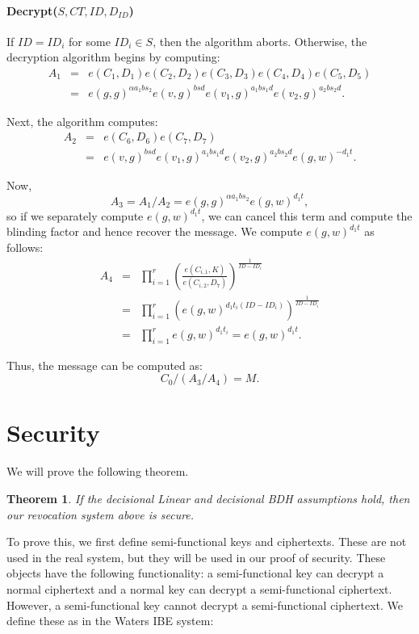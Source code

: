 \documentclass[a4paper, 11pt]{article}
\newtheorem{theorem}{Theorem}
\newtheorem{theorem}{Theorem}[section]
\theoremstyle{definition}
\begin{document}
\paragraph{Decrypt($S, CT, ID, D_{ID}$)} If $ID = ID_i$ for some $ID_i \in S$, then the algorithm aborts. Otherwise, the decryption algorithm begins by computing:
\begin{eqnarray}
 \nonumber
  A_1 &=& e(C_1, D_1) e(C_2,D_2) e(C_3,D_3) e(C_4, D_4) e(C_5, D_5) \\
  \nonumber
   &=& e(g,g)^{\alpha a_1 b s_2} e(v,g)^{bsd}e(v_1,g)^{a_1bs_1d}e(v_2,g)^{a_2bs_2 d}.
\end{eqnarray}

Next, the algorithm computes:
\begin{eqnarray}
\nonumber
A_2 & = & e(C_6,D_6) e(C_7, D_7) \\ \nonumber
 & = & e(v,g)^{bsd}e(v_1,g)^{a_1bs_1 d}e(v_2,g)^{a_2 b s_2 d} e(g,w)^{-d_1 t}.
\end{eqnarray}

Now,
\[A_3 = A_1/A_2 = e(g,g)^{\alpha a_1 b s_2} e(g,w)^{d_1 t},\]  so if we separately compute $e(g,w)^{d_1 t}$, we can cancel this term and compute the blinding factor and hence recover the message. We compute $e(g,w)^{d_1 t}$ as follows:
\begin{eqnarray}
\nonumber
A_4 & = & \prod_{i=1}^r \left(\frac{e(C_{i,1},K)}{e(C_{i,2},D_7)}\right)^{\frac{1}{ID-ID_i}} \\
\nonumber
 & = & \prod_{i=1}^r \left( e(g,w)^{d_1 t_i (ID-ID_i)}\right)^{\frac{1}{ID-ID_i}} \\
 \nonumber
 & = & \prod_{i=1}^r e(g,w)^{d_1 t_i} = e(g,w)^{d_1 t}.
 \end{eqnarray}

Thus, the message can be computed as:
\[C_0 / (A_3/A_4) = M.\]

\section{Security}
\label{sec:security}
We will prove the following theorem.

\begin{theorem} If the decisional Linear and decisional BDH assumptions hold, then our revocation system above is secure.
\end{theorem}

To prove this, we first define semi-functional keys and ciphertexts. These are not used in the real system, but they will be used in our proof of security. These objects have the following functionality: a semi-functional key can decrypt a normal ciphertext and a normal key can decrypt a semi-functional ciphertext. However, a semi-functional key cannot decrypt a semi-functional ciphertext. We define these as in the Waters IBE system:
\end{document}
